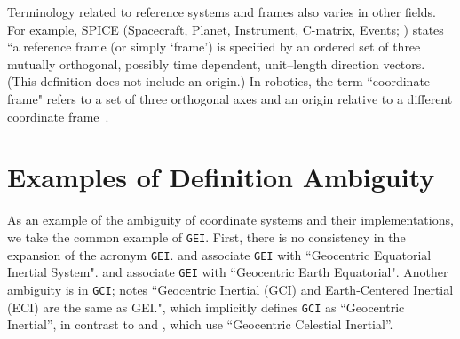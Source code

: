 \documentclass[draft]{agujournal2019}
\begin{document}

Terminology related to reference systems and frames also varies in other fields. For example, SPICE (Spacecraft, Planet, Instrument, C-matrix, Events; ) states ``a reference frame (or simply `frame') is specified by an ordered set of three mutually orthogonal, possibly time dependent, unit--length direction vectors. (This definition does not include an origin.) In robotics, the term ``coordinate frame" refers to a set of three orthogonal axes and an origin relative to a different coordinate frame~\cite{Murray2017}. 

\section{Examples of Definition Ambiguity}
\label{sect:definitions}

As an example of the ambiguity of coordinate systems and their implementations, we take the common example of \texttt{GEI}. First, there is no consistency in the expansion of the acronym \texttt{GEI}.  and  associate \texttt{GEI} with ``Geocentric Equatorial Inertial System".  and  associate \texttt{GEI} with ``Geocentric Earth Equatorial". Another ambiguity is in \texttt{GCI};  notes ``Geocentric Inertial (GCI) and Earth-Centered Inertial (ECI) are the same as GEI.", which implicitly defines \texttt{GCI} as ``Geocentric Inertial'', in contrast to  and
, which use ``Geocentric Celestial Inertial''. 
\end{document}
